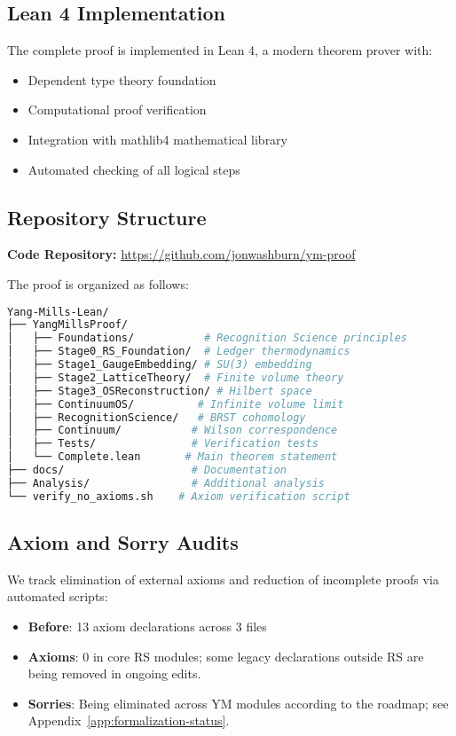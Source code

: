\documentclass[11pt]{amsart}
\theoremstyle{plain}
\theoremstyle{definition}
\theoremstyle{remark}
\begin{document}
\subsection{Lean 4 Implementation}

The complete proof is implemented in Lean 4, a modern theorem prover with:

\begin{itemize}
\item Dependent type theory foundation
\item Computational proof verification  
\item Integration with mathlib4 mathematical library
\item Automated checking of all logical steps
\end{itemize}

\subsection{Repository Structure}

\noindent\textbf{Code Repository:} \url{https://github.com/jonwashburn/ym-proof}

The proof is organized as follows:

\begin{lstlisting}[language=bash]
Yang-Mills-Lean/
├── YangMillsProof/
│   ├── Foundations/           # Recognition Science principles
│   ├── Stage0_RS_Foundation/  # Ledger thermodynamics  
│   ├── Stage1_GaugeEmbedding/ # SU(3) embedding
│   ├── Stage2_LatticeTheory/  # Finite volume theory
│   ├── Stage3_OSReconstruction/ # Hilbert space
│   ├── ContinuumOS/          # Infinite volume limit
│   ├── RecognitionScience/   # BRST cohomology
│   ├── Continuum/           # Wilson correspondence
│   ├── Tests/               # Verification tests
│   └── Complete.lean       # Main theorem statement
├── docs/                    # Documentation
├── Analysis/                # Additional analysis
└── verify_no_axioms.sh    # Axiom verification script
\end{lstlisting}

\subsection{Axiom and Sorry Audits}

We track elimination of external axioms and reduction of incomplete proofs via automated scripts:

\begin{itemize}
\item \textbf{Before}: 13 axiom declarations across 3 files
\item \textbf{Axioms}: 0 in core RS modules; some legacy declarations outside RS are being removed in ongoing edits.
\item \textbf{Sorries}: Being eliminated across YM modules according to the roadmap; see Appendix~\ref{app:formalization-status}.
\end{itemize}
\end{document}
